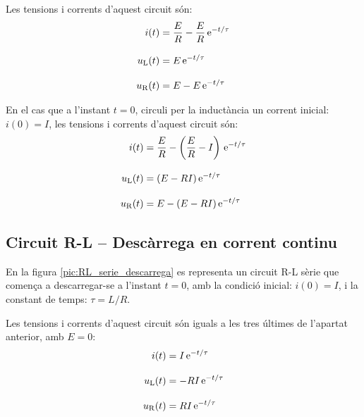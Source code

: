 Les tensions i corrents d'aquest circuit són:
\begin{align}
    i(t) &= \frac{E}{R}  - \frac{E}{R} \,\mathrm{e}^{-t/\tau}\label{eq:RL-i-carrega} \\[3mm]
    u_\mathrm{L}(t) &= E\,\mathrm{e}^{-t/\tau}\label{eq:RL-ul-carrega} \\[3mm]
    u_\mathrm{R}(t) &= E - E\,\mathrm{e}^{-t/\tau}
\end{align}

En el cas que a l'instant $t=0$, circuli per la inductància un corrent inicial: $i(0) = I$, les tensions i corrents d'aquest circuit són:
\begin{align}
    i(t) &= \frac{E}{R}  - \left(\frac{E}{R}-I\right) \,\mathrm{e}^{-t/\tau}\label{eq:RL-i-carrega-ini} \\[3mm]
    u_\mathrm{L}(t) &= (E- R I)\,\mathrm{e}^{-t/\tau}\label{eq:RL-ul-carrega-ini} \\[3mm]
    u_\mathrm{R}(t) &= E - (E-R I)\,\mathrm{e}^{-t/\tau}
\end{align}

\subsection{Circuit R-L -- Descàrrega en corrent continu}

En la figura \vref{pic:RL_serie_descarrega} es representa un circuit R-L sèrie que comença a descarregar-se a l'instant $t=0$, amb la condició inicial: $i(0) = I$, i la constant de temps: $\tau = L/R$.
\begin{center}
    
    \label{pic:RL_serie_descarrega}
\end{center}

Les tensions i corrents d'aquest circuit són iguals a les tres últimes de l'apartat anterior, amb $E=0$:
\begin{align}
    i(t) &= I\,\mathrm{e}^{-t/\tau} \label{eq:RL-i-descarrega}\\[3mm]
    u_\mathrm{L}(t) &= - R I\,\mathrm{e}^{-t/\tau}\label{eq:RL-ul-descarrega} \\[3mm]
    u_\mathrm{R}(t) &= R I\,\mathrm{e}^{-t/\tau}
\end{align}

